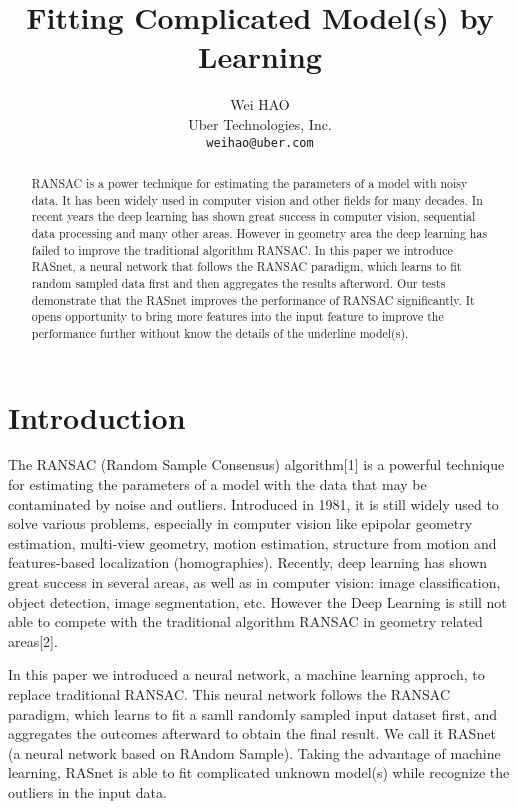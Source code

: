 \documentclass{article}
\title{Fitting Complicated Model(s) by Learning}
\author{%
  Wei HAO \\
  Uber Technologies, Inc. \\
  \texttt{weihao@uber.com} \\
}
\begin{document}
\maketitle

\begin{abstract}
RANSAC is a power technique for estimating the parameters of a model with noisy data. 
It has been widely used in computer vision and other fields for  many decades. In recent years the deep learning has shown great success in computer vision, sequential data processing and many other areas. However in geometry area the deep learning has failed to improve the traditional algorithm RANSAC. 
In this paper we introduce RASnet, a neural network that follows the RANSAC paradigm, which learns to fit random sampled data first and then aggregates the results afterword. 
 Our tests demonstrate that the RASnet improves the performance of RANSAC significantly. It opens opportunity to bring more features into the input feature to improve the performance further without know the details of the underline model(s).
\end{abstract}

\section{Introduction}
The RANSAC (Random Sample Consensus) algorithm[1] is a powerful technique for estimating the parameters of a model with the data that may be contaminated by noise and outliers. Introduced in 1981, it is still widely used to solve various problems, especially in computer vision like epipolar geometry estimation, multi-view geometry, motion estimation, structure from motion and features-based localization (homographies).
Recently, deep learning has shown great success in several areas, as well as in computer vision: image classification, object detection, image segmentation, etc.
However the Deep Learning is still not able to compete with the traditional algorithm RANSAC in geometry related areas[2].

In this paper we introduced a neural network, a machine learning approch, to replace traditional RANSAC. This neural network follows the RANSAC paradigm, which learns to fit a samll randomly sampled input dataset first, and aggregates the outcomes afterward to obtain the final result. We call it RASnet (a neural network based on RAndom Sample). Taking the advantage of machine learning, RASnet is able to fit complicated unknown model(s) while recognize the outliers in the input data.
\end{document}
